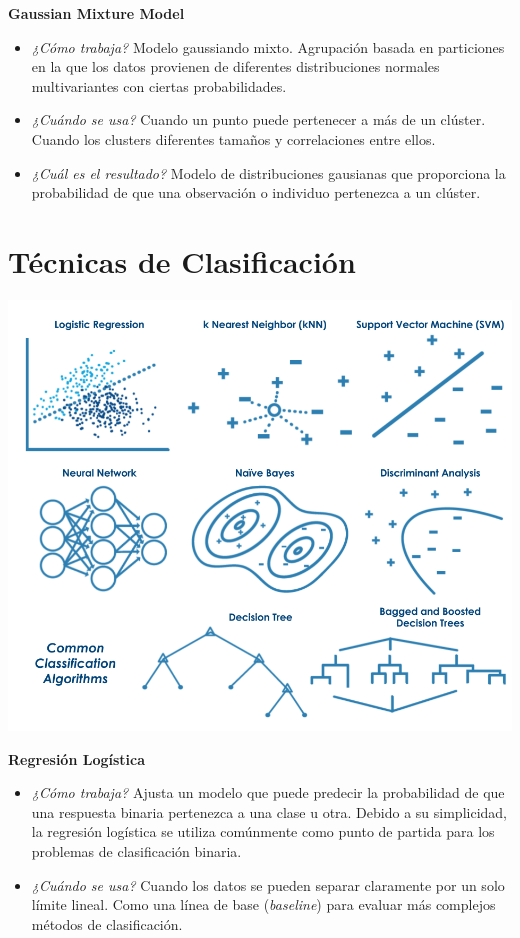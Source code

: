 \documentclass[]{book}
\begin{document}
\textbf{Gaussian Mixture Model}

\begin{itemize}
\item
  \emph{¿Cómo trabaja?} Modelo gaussiando mixto. Agrupación basada en particiones en la que los datos provienen de diferentes distribuciones normales multivariantes con ciertas probabilidades.
\item
  \emph{¿Cuándo se usa?} Cuando un punto puede pertenecer a más de un clúster. Cuando los clusters diferentes tamaños y correlaciones entre ellos.
\item
  \emph{¿Cuál es el resultado?} Modelo de distribuciones gausianas que proporciona la probabilidad de que una observación o individuo pertenezca a un clúster.
\end{itemize}

\hypertarget{tecnicas-de-clasificacion}{%
\section{Técnicas de Clasificación}\label{tecnicas-de-clasificacion}}

\includegraphics[width=0.8\linewidth]{imgs/classificationtechniques}

\textbf{Regresión Logística}

\begin{itemize}
\item
  \emph{¿Cómo trabaja?} Ajusta un modelo que puede predecir la probabilidad de que una respuesta binaria pertenezca a una clase u otra. Debido a su simplicidad, la regresión logística se utiliza comúnmente como punto de partida para los problemas de clasificación binaria.
\item
  \emph{¿Cuándo se usa?} Cuando los datos se pueden separar claramente por un solo límite lineal. Como una línea de base (\emph{baseline}) para evaluar más complejos métodos de clasificación.
\end{itemize}
\end{document}
